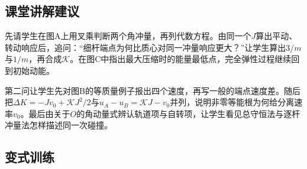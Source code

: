 \documentclass[UTF8,fontset=fandol,a4paper,11pt]{ctexart}
\begin{document}


\subsection*{课堂讲解建议}

先请学生在图A上用叉乘判断两个角冲量，再列代数方程。由同一个$J$算出平动、转动响应后，追问：“细杆端点为何比质心对同一冲量响应更大？”让学生算出$3/m$与$1/m$，再合成$\mathcal K$。在图C中指出最大压缩时的能量最低点，完全弹性过程继续回到初始动能。

第二问让学生先对图B的等质量例子报出四个速度，再写一般的端点速度差。随后把$\Delta K=-Jv_0+\mathcal KJ^2/2$与$u_A-u_B=\mathcal KJ-v_0$并列，说明非零等能根为何给分离速率$v_0$。最后由关于$O$的角动量式辨认轨道项与自转项，让学生看见总守恒法与逐杆冲量法怎样描述同一次碰撞。



\subsection*{变式训练}
\end{document}
